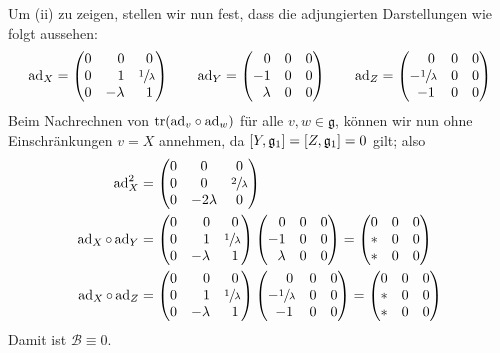 \begin{beweis}
	Um (ii) zu zeigen, stellen wir nun fest, dass die adjungierten Darstellungen wie folgt aussehen:
	\[
		\ad_X = \begin{pmatrix*}[r]
			0 & 0 & 0\, \\
			0 & 1 & \sfrac{1}{\lambda} \\
			0 & -\lambda & 1\,
		\end{pmatrix*}
		\qquad 
		\ad_Y = \begin{pmatrix*}[r]
			0 & 0 & 0 \\
			-1 & 0 & 0 \\
			\lambda & 0 & 0
		\end{pmatrix*}
		\qquad 
		\ad_Z = \begin{pmatrix*}[r]
			0\, & 0 & 0 \\
			- \sfrac{1}{\lambda} & 0 & 0 \\
			-1\, & 0 & 0
		\end{pmatrix*}
	\]
	Beim Nachrechnen von $\tr \enbrace*{{\ad_v} \circ {\ad_w}}$ für alle $v,w \in \mathfrak{g}$, können wir nun ohne Einschränkungen $v=X$ annehmen, da $\benbrace*{Y,\mathfrak{g}_1} = \benbrace*{Z, \mathfrak{g}_1}=0$ gilt; also
	\begin{align}
		\ad_X^2 &= \begin{pmatrix}
			0 & 0 & 0 \\
			0 & 0 & \sfrac{2}{\lambda} \\
			0 & - 2 \lambda & 0
		\end{pmatrix} \\
		\ad_X \circ \ad_Y &= \begin{pmatrix*}[r]
			0 & 0 & 0\, \\
			0 & 1 & \sfrac{1}{\lambda} \\
			0 & -\lambda & 1\,
		\end{pmatrix*}
		\begin{pmatrix*}[r]
			0 & 0 & 0 \\
			-1 & 0 & 0 \\
			\lambda & 0 & 0
		\end{pmatrix*}
		= \begin{pmatrix}
			0 & 0 & 0 \\
			* & 0 & 0 \\
			* & 0 & 0
		\end{pmatrix} \\
		\ad_X \circ \ad_Z &= 
		\begin{pmatrix*}[r]
			0 & 0 & 0\, \\
			0 & 1 & \sfrac{1}{\lambda} \\
			0 & -\lambda & 1\,
		\end{pmatrix*}
		\begin{pmatrix*}[r]
			0\, & 0 & 0 \\
			- \sfrac{1}{\lambda} & 0 & 0 \\
			-1\, & 0 & 0
		\end{pmatrix*}
		= \begin{pmatrix}
			0 & 0 & 0 \\
			* & 0 & 0 \\
			* & 0 & 0
		\end{pmatrix}
	\end{align}
	Damit ist $\mathcal{B} \equiv 0$.
\end{beweis}












